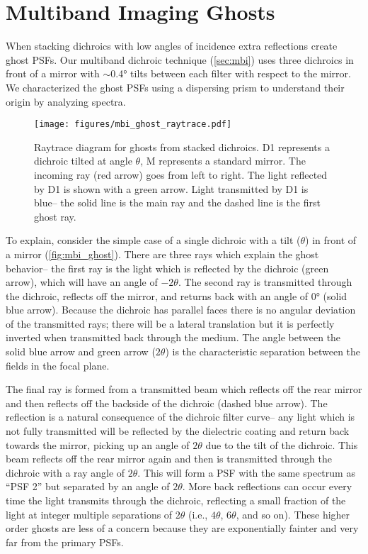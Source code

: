 \section{Multiband Imaging Ghosts}\label{sec:ghosts}

When stacking dichroics with low angles of incidence extra reflections create ghost PSFs. Our multiband dichroic technique (\autoref{sec:mbi}) uses three dichroics in front of a mirror with $\sim$\ang{0.4} tilts between each filter with respect to the mirror. We characterized the ghost PSFs using a dispersing prism to understand their origin by analyzing spectra.
\begin{figure}
    \centering
    \texttt{[image: figures/mbi\_ghost\_raytrace.pdf]}
    \caption{Raytrace diagram for ghosts from stacked dichroics. D1 represents a dichroic tilted at angle $\theta$, M represents a standard mirror. The incoming ray (red arrow) goes from left to right. The light reflected by D1 is shown with a green arrow. Light transmitted by D1 is blue-- the solid line is the main ray and the dashed line is the first ghost ray.\label{fig:mbi_ghost}}
\end{figure}

To explain, consider the simple case of a single dichroic with a tilt ($\theta$) in front of a mirror (\autoref{fig:mbi_ghost}). There are three rays which explain the ghost behavior-- the first ray is the light which is reflected by the dichroic (green arrow), which will have an angle of $-2\theta$. The second ray is transmitted through the dichroic, reflects off the mirror, and returns back with an angle of \ang{0} (solid blue arrow). Because the dichroic has parallel faces there is no angular deviation of the transmitted rays; there will be a lateral translation but it is perfectly inverted when transmitted back through the medium. The angle between the solid blue arrow and green arrow ($2\theta$) is the characteristic separation between the fields in the focal plane.

The final ray is formed from a transmitted beam which reflects off the rear mirror and then reflects off the backside of the dichroic (dashed blue arrow). The reflection is a natural consequence of the dichroic filter curve-- any light which is not fully transmitted will be reflected by the dielectric coating and return back towards the mirror, picking up an angle of $2\theta$ due to the tilt of the dichroic. This beam reflects off the rear mirror again and then is transmitted through the dichroic with a ray angle of $2\theta$. This will form a PSF with the same spectrum as ``PSF 2'' but separated by an angle of $2\theta$. More back reflections can occur every time the light transmits through the dichroic, reflecting a small fraction of the light at integer multiple separations of $2\theta$ (i.e., $4\theta$, $6\theta$, and so on). These higher order ghosts are less of a concern because they are exponentially fainter and very far from the primary PSFs.

